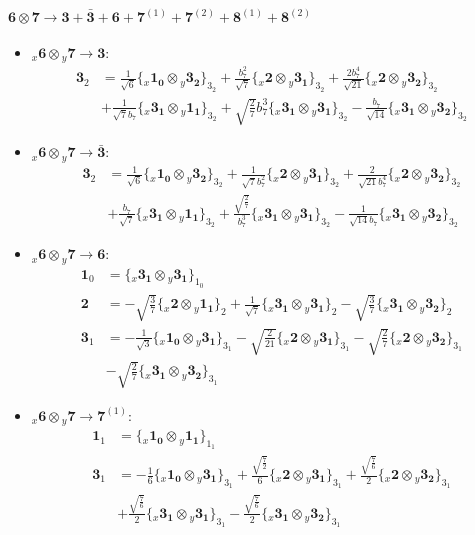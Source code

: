 \documentclass[english]{article}
\newcommand{\rep}[1]{\mathbf{#1}}
\newcommand{\repx}[2]{{}_{#2}\mathbf{#1}}
\newcommand{\tsprod}[2]{\rep{#1}\otimes\rep{#2}}
\newcommand{\tsprodx}[2]{\repx{#1}{x}\otimes\repx{#2}{y}}
\newcommand{\subcgs}[3]{\big\{ \tsprodx{#1}{#2}\big\}^{}_{#3}}
\begin{document}
\paragraph*{\Large $\tsprod{6}{7}\to\rep{3}+\rep{\bar{3}}+\rep{6}+\rep{7}^{(1)}+\rep{7}^{(2)}+\rep{8}^{(1)}+\rep{8}^{(2)}$}
\begin{itemize}
\item $\tsprodx{6}{7}\to\rep{3}$:
\begin{align*}
\rep{3}_{2} & = \frac{1}{\sqrt{6}}\subcgs{1_{0}}{3_{2}}{3_{2}}+\frac{b_7^2}{\sqrt{7}}\subcgs{2}{3_{1}}{3_{2}}+\frac{2 b_7^4}{\sqrt{21}}\subcgs{2}{3_{2}}{3_{2}} \\ 
 & +\frac{1}{\sqrt{7} b_7}\subcgs{3_{1}}{1_{1}}{3_{2}}+\sqrt{\frac{2}{7}} b_7^3\subcgs{3_{1}}{3_{1}}{3_{2}}-\frac{b_7}{\sqrt{14}}\subcgs{3_{1}}{3_{2}}{3_{2}}
\end{align*}
\item $\tsprodx{6}{7}\to\rep{\bar{3}}$:
\begin{align*}
\rep{3}_{2} & = \frac{1}{\sqrt{6}}\subcgs{1_{0}}{3_{2}}{3_{2}}+\frac{1}{\sqrt{7} b_7^2}\subcgs{2}{3_{1}}{3_{2}}+\frac{2}{\sqrt{21} b_7^4}\subcgs{2}{3_{2}}{3_{2}} \\ 
 & +\frac{b_7}{\sqrt{7}}\subcgs{3_{1}}{1_{1}}{3_{2}}+\frac{\sqrt{\frac{2}{7}}}{b_7^3}\subcgs{3_{1}}{3_{1}}{3_{2}}-\frac{1}{\sqrt{14} b_7}\subcgs{3_{1}}{3_{2}}{3_{2}}
\end{align*}
\item $\tsprodx{6}{7}\to\rep{6}$:
\begin{align*}
\rep{1}_{0} & = \subcgs{3_{1}}{3_{1}}{1_{0}}
\\
\rep{2} & = -\sqrt{\frac{3}{7}}\subcgs{2}{1_{1}}{2}+\frac{1}{\sqrt{7}}\subcgs{3_{1}}{3_{1}}{2}-\sqrt{\frac{3}{7}}\subcgs{3_{1}}{3_{2}}{2}
\\
\rep{3}_{1} & = -\frac{1}{\sqrt{3}}\subcgs{1_{0}}{3_{1}}{3_{1}}-\sqrt{\frac{2}{21}}\subcgs{2}{3_{1}}{3_{1}}-\sqrt{\frac{2}{7}}\subcgs{2}{3_{2}}{3_{1}} \\ 
 & -\sqrt{\frac{2}{7}}\subcgs{3_{1}}{3_{2}}{3_{1}}
\end{align*}
\item $\tsprodx{6}{7}\to\rep{7}^{(1)}$:
\begin{align*}
\rep{1}_{1} & = \subcgs{1_{0}}{1_{1}}{1_{1}}
\\
\rep{3}_{1} & = -\frac{1}{6}\subcgs{1_{0}}{3_{1}}{3_{1}}+\frac{\sqrt{\frac{7}{2}}}{6}\subcgs{2}{3_{1}}{3_{1}}+\frac{\sqrt{\frac{7}{6}}}{2}\subcgs{2}{3_{2}}{3_{1}} \\ 
 & +\frac{\sqrt{\frac{7}{6}}}{2}\subcgs{3_{1}}{3_{1}}{3_{1}}-\frac{\sqrt{\frac{7}{6}}}{2}\subcgs{3_{1}}{3_{2}}{3_{1}}

\end{align*}
\end{itemize}
\end{document}

